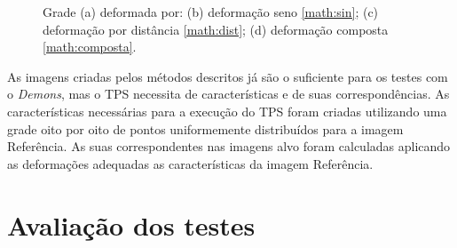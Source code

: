 \begin{figure}[H]
\begin{subfigure}[t]{0.3\textwidth}
	  \label{fig:movingImageDistSin}
	\end{subfigure}
	\caption{Grade (a) deformada por: (b) deformação seno \ref{math:sin}; (c) deformação por distância \ref{math:dist}; 
				(d) deformação composta \ref{math:composta}. }
	\label{fig:deformacoes}
\end{figure}

	As imagens criadas pelos métodos descritos já são o suficiente para os testes com o \textit{Demons}, mas o TPS
necessita de características e de suas correspondências. As características necessárias para a execução do TPS foram 
criadas utilizando uma grade oito por oito de pontos uniformemente distribuídos para a imagem Referência. As suas 
correspondentes nas imagens alvo foram calculadas aplicando as deformações adequadas as características da imagem 
Referência.

\section{Avaliação dos testes}

